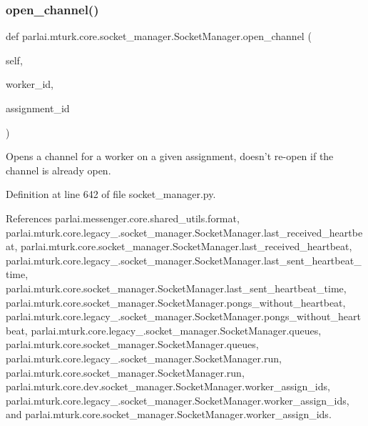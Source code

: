 \subsubsection{\texorpdfstring{open\+\_\+channel()}{open\_channel()}}
{\footnotesize\ttfamily def parlai.\+mturk.\+core.\+socket\+\_\+manager.\+Socket\+Manager.\+open\+\_\+channel (\begin{DoxyParamCaption}\item[{}]{self,  }\item[{}]{worker\+\_\+id,  }\item[{}]{assignment\+\_\+id }\end{DoxyParamCaption})}

\begin{DoxyVerb}Opens a channel for a worker on a given assignment, doesn't re-open
if the channel is already open.\end{DoxyVerb}
 

Definition at line 642 of file socket\+\_\+manager.\+py.



References parlai.\+messenger.\+core.\+shared\+\_\+utils.\+format, parlai.\+mturk.\+core.\+legacy\+\_.\+socket\+\_\+manager.\+Socket\+Manager.\+last\+\_\+received\+\_\+heartbeat, parlai.\+mturk.\+core.\+socket\+\_\+manager.\+Socket\+Manager.\+last\+\_\+received\+\_\+heartbeat, parlai.\+mturk.\+core.\+legacy\+\_.\+socket\+\_\+manager.\+Socket\+Manager.\+last\+\_\+sent\+\_\+heartbeat\+\_\+time, parlai.\+mturk.\+core.\+socket\+\_\+manager.\+Socket\+Manager.\+last\+\_\+sent\+\_\+heartbeat\+\_\+time, parlai.\+mturk.\+core.\+socket\+\_\+manager.\+Socket\+Manager.\+pongs\+\_\+without\+\_\+heartbeat, parlai.\+mturk.\+core.\+legacy\+\_.\+socket\+\_\+manager.\+Socket\+Manager.\+pongs\+\_\+without\+\_\+heartbeat, parlai.\+mturk.\+core.\+legacy\+\_.\+socket\+\_\+manager.\+Socket\+Manager.\+queues, parlai.\+mturk.\+core.\+socket\+\_\+manager.\+Socket\+Manager.\+queues, parlai.\+mturk.\+core.\+legacy\+\_.\+socket\+\_\+manager.\+Socket\+Manager.\+run, parlai.\+mturk.\+core.\+socket\+\_\+manager.\+Socket\+Manager.\+run, parlai.\+mturk.\+core.\+dev.\+socket\+\_\+manager.\+Socket\+Manager.\+worker\+\_\+assign\+\_\+ids, parlai.\+mturk.\+core.\+legacy\+\_.\+socket\+\_\+manager.\+Socket\+Manager.\+worker\+\_\+assign\+\_\+ids, and parlai.\+mturk.\+core.\+socket\+\_\+manager.\+Socket\+Manager.\+worker\+\_\+assign\+\_\+ids.

\mbox{\label{classparlai_1_1mturk_1_1core_1_1socket__manager_1_1SocketManager_a7b41199438da8694cc9c8d9b3e58da85}} 
